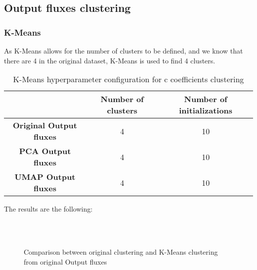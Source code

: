 	\subsection{Output fluxes clustering}

		\subsubsection{K-Means}
			
			As K-Means allows for the number of clusters to be defined, and we know that there are 4 in the original dataset, K-Means is used to find 4 clusters.
			
			\begin{table}[h!]
				\centering
				\begin{tabular}{|c|c|c|}
					\hline
					& \textbf{Number of clusters} & \textbf{Number of initializations}\\
					\hline
					\textbf{Original Output fluxes} & 4 & 10\\
					\hline
					\textbf{PCA Output fluxes} & 4 & 10\\
					\hline
					\textbf{UMAP Output fluxes} & 4 & 10\\
					\hline
				\end{tabular}
				\caption{K-Means hyperparameter configuration for c coefficients clustering}
			\end{table}
		
			The results are the following:
			
			\begin{figure*}[ht!]
				\centering
				\hspace{\fill}
				\\
				\hspace{\fill}
				\\
					
				\hspace{\fill}
				\caption{Comparison between original clustering and K-Means clustering from original Output fluxes}
			\end{figure*}
			\FloatBarrier
		
